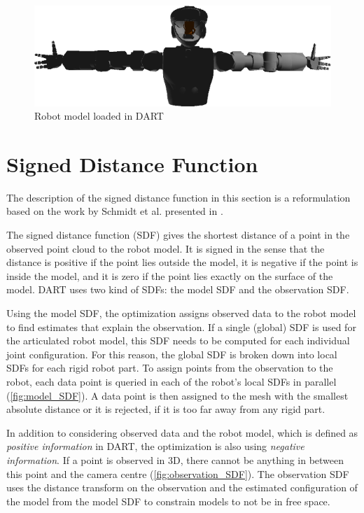 \begin{figure}
\centering
\includegraphics[width=\textwidth]{images/valkyrie/val_model_torso_dart.png}
\caption{Robot model loaded in DART}
\label{fig:val_model_dart}
\end{figure}


\section{Signed Distance Function}

The description of the signed distance function in this section is a reformulation based on the work by Schmidt et al. presented in \cite{Schmidt2015}.

The signed distance function (SDF) gives the shortest distance of a point in the observed point cloud to the robot model. It is signed in the sense that the distance is positive if the point lies outside the model, it is negative if the point is inside the model, and it is zero if the point lies exactly on the surface of the model. DART uses two kind of SDFs: the model SDF and the observation SDF.

Using the model SDF, the optimization assigns observed data to the robot model to find estimates that explain the observation. If a single (global) SDF is used for the articulated robot model, this SDF needs to be computed for each individual joint configuration. For this reason, the global SDF is broken down into local SDFs for each rigid robot part. To assign points from the observation to the robot, each data point is queried in each of the robot's local SDFs in parallel (\cref{fig:model_SDF}). A data point is then assigned to the mesh with the smallest absolute distance or it is rejected, if it is too far away from any rigid part.

In addition to considering observed data and the robot model, which is defined as \textit{positive information} in DART, the optimization is also using \textit{negative information}. If a point is observed in 3D, there cannot be anything in between this point and the camera centre (\cref{fig:observation_SDF}). The observation SDF uses the distance transform on the observation and the estimated configuration of the model from the model SDF to constrain models to not be in free space.

